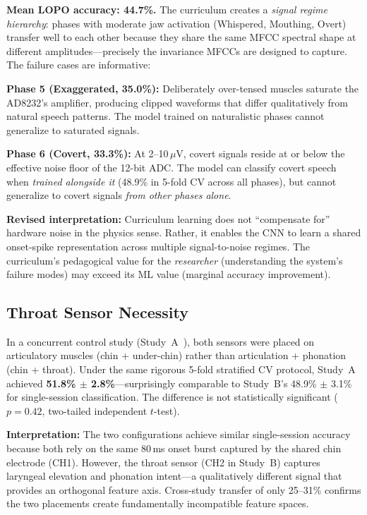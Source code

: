 \documentclass[11pt, a4paper]{article}
\begin{document}
\textbf{Mean LOPO accuracy: 44.7\%.} The curriculum creates a \emph{signal regime hierarchy}: phases with moderate jaw activation (Whispered, Mouthing, Overt) transfer well to each other because they share the same MFCC spectral shape at different amplitudes---precisely the invariance MFCCs are designed to capture. The failure cases are informative:

\textbf{Phase 5 (Exaggerated, 35.0\%):} Deliberately over-tensed muscles saturate the AD8232's amplifier, producing clipped waveforms that differ qualitatively from natural speech patterns. The model trained on naturalistic phases cannot generalize to saturated signals.

\textbf{Phase 6 (Covert, 33.3\%):} At 2--10\,$\mu$V, covert signals reside at or below the effective noise floor of the 12-bit ADC. The model can classify covert speech when \emph{trained alongside it} (48.9\% in 5-fold CV across all phases), but cannot generalize to covert signals \emph{from other phases alone}.

\textbf{Revised interpretation:} Curriculum learning does not ``compensate for'' hardware noise in the physics sense. Rather, it enables the CNN to learn a shared onset-spike representation across multiple signal-to-noise regimes. The curriculum's pedagogical value for the \emph{researcher} (understanding the system's failure modes) may exceed its ML value (marginal accuracy improvement).

\subsection{Throat Sensor Necessity}

In a concurrent control study (Study~A~\cite{kho2026companion}), both sensors were placed on articulatory muscles (chin + under-chin) rather than articulation + phonation (chin + throat). Under the same rigorous 5-fold stratified CV protocol, Study~A achieved \textbf{51.8\% $\pm$ 2.8\%}---surprisingly comparable to Study~B's 48.9\% $\pm$ 3.1\% for single-session classification. The difference is not statistically significant ($p = 0.42$, two-tailed independent $t$-test).

\textbf{Interpretation:} The two configurations achieve similar single-session accuracy because both rely on the same 80\,ms onset burst captured by the shared chin electrode (CH1). However, the throat sensor (CH2 in Study~B) captures laryngeal elevation and phonation intent---a qualitatively different signal that provides an orthogonal feature axis. Cross-study transfer of only 25--31\% confirms the two placements create fundamentally incompatible feature spaces.
\end{document}
